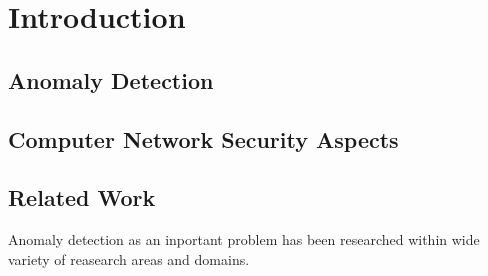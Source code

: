 

\chapter{Introduction}

\section{Anomaly Detection}

\section{Computer Network Security Aspects}

\section{Related Work}

Anomaly detection as an inportant problem has been researched within wide variety of reasearch areas and domains.

